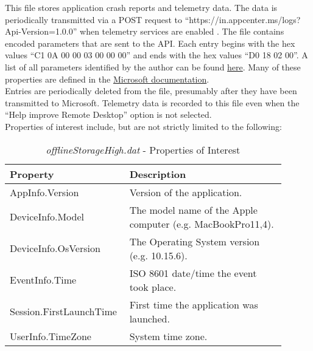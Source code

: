 \documentclass[journal]{IEEEtran}
\begin{document}
This file stores application crash reports and telemetry data. The data is periodically transmitted via a POST request to “https://in.appcenter.ms/logs?Api-Version=1.0.0” when telemetry services are enabled \cite{king-of-spades_upload_nodate} \cite{king-of-spades_app_nodate}. The file contains encoded parameters that are sent to the API. Each entry begins with the hex values “C1 0A 00 00 03 00 00 00” and ends with the hex values “D0 18 02 00”. A list of all parameters identified by the author can be found \href{https://jholtmann.github.io/mrdpf/\#mrdpf.parser\_definitions.OFFLINE\_STORAGE\_PARAMETERS'}{here}. Many of these properties are defined in the \href{https://docs.microsoft.com/en-us/deployoffice/privacy/required-diagnostic-data}{Microsoft documentation}.\\

Entries are periodically deleted from the file, presumably after they have been transmitted to Microsoft. Telemetry data is recorded to this file even when the “Help improve Remote Desktop” option is not selected.\\

Properties of interest include, but are not strictly limited to the following:
\begin{table}[h!]
\caption{\textit{offlineStorageHigh.dat} - Properties of Interest}
\begin{tabular}{p{0.35\linewidth} | p{0.55\linewidth}}
Property  						& Description \\ \hline
AppInfo.Version 					& Version of the application.                                                                                        \\	 
DeviceInfo.Model                                & The model name of the Apple computer (e.g. MacBookPro11,4).                                                        \\
DeviceInfo.OsVersion                          & The Operating System version (e.g. 10.15.6).                                                                       \\
EventInfo.Time                                   & ISO 8601 date/time the event took place.                                                                           \\
Session.FirstLaunchTime                     & First time the application was launched.                                                                           \\
UserInfo.TimeZone                                & System time zone.                                                                                                  \\
\end{tabular}
\end{table}
\end{document}
